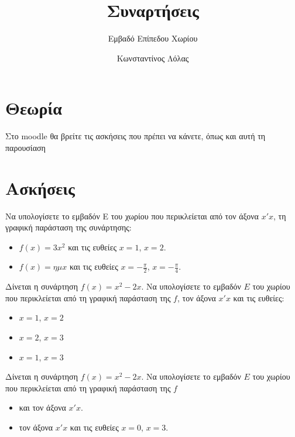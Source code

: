 \documentclass{../presentation}
\title{Συναρτήσεις}
\subtitle{Εμβαδό Επίπεδου Χωρίου}
\author[Λόλας]{Κωνσταντίνος Λόλας}
\institute[$10^ο$ ΓΕΛ]{$10^ο$ ΓΕΛ Θεσσαλονίκης}
\date{}
\begin{document}
\begin{frame}
  \titlepage
\end{frame}

\section{Θεωρία}

\begin{frame}[noframenumbering]
  Στο moodle θα βρείτε τις ασκήσεις που πρέπει να κάνετε, όπως και αυτή τη παρουσίαση
\end{frame}

\section{Ασκήσεις}

\exercises

\begin{askisi}
  Να υπολογίσετε το εμβαδόν E του χωρίου που περικλείεται από τον άξονα $x'x$, τη γραφική παράσταση της συνάρτησης:
  \begin{itemize}[<+->]
    \item $f(x)=3x^2$ και τις ευθείες $x=1$, $x=2$.
    \item $f(x)=ημx$ και τις ευθείες $x=-\frac{π}{2}$, $x=-\frac{π}{4}$.
  \end{itemize}
\end{askisi}

\begin{askisi}
  Δίνεται η συνάρτηση $f(x)=x^2-2x$. Να υπολογίσετε το εμβαδόν $E$ του χωρίου που περικλείεται από τη γραφική παράσταση της $f$, τον άξονα $x'x$ και τις ευθείες:
  \begin{itemize}[<+->]
    \item $x=1$, $x=2$
    \item $x=2$, $x=3$
    \item $x=1$, $x=3$
  \end{itemize}
\end{askisi}

\begin{askisi}
  Δίνεται η συνάρτηση $f(x)=x^2-2x$. Να υπολογίσετε το εμβαδόν $E$ του χωρίου που περικλείεται από τη γραφική παράσταση της $f$
  \begin{itemize}[<+->]
    \item και τον άξονα $x'x$.
    \item τον άξονα $x'x$ και τις ευθείες $x=0$, $x=3$.
  \end{itemize}
\end{askisi}
\end{document}
